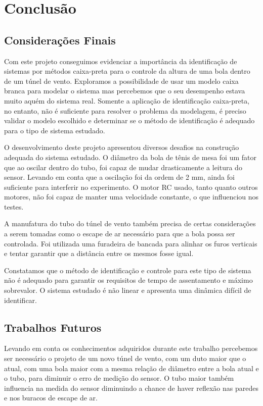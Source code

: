 \chapter{Conclusão} \label{cap7}

\section{Considerações Finais}
Com este projeto conseguimos evidenciar a importância da identificação de sistemas por métodos caixa-preta para o controle da altura de uma bola dentro de um túnel de vento. Exploramos a possibilidade de usar um modelo caixa branca para modelar o sistema mas percebemos que o seu desempenho estava muito aquém do sistema real. Somente a aplicação de identificação caixa-preta, no entanto, não é suficiente para resolver o problema da modelagem, é preciso validar o modelo escolhido e determinar se o método de identificação é adequado para o tipo de sistema estudado.


O desenvolvimento deste projeto apresentou diversos desafios na construção adequada do sistema estudado. O diâmetro da bola de tênis de mesa foi um fator que ao oscilar dentro do tubo, foi capaz de mudar drasticamente a leitura do sensor. Levando em conta que a oscilação foi da ordem de 2 mm, ainda foi suficiente para interferir no experimento. O motor RC usado, tanto quanto outros motores, não foi capaz de manter uma velocidade constante, o que influenciou nos testes.


A manufatura do tubo do túnel de vento também precisa de certas considerações a serem tomadas como o escape de ar necessário para que a bola possa ser controlada. Foi utilizada uma furadeira de bancada para alinhar os furos verticais e tentar garantir que a distância entre os mesmos fosse igual.


Constatamos que o método de identificação e controle para este tipo de sistema não é adequado para garantir os requisitos de tempo de assentamento e máximo sobrevalor. O sistema estudado é não linear e apresenta uma dinâmica difícil de identificar.




\section{Trabalhos Futuros}
Levando em conta os conhecimentos adquiridos durante este trabalho percebemos ser necessário o projeto de um novo túnel de vento, com um duto maior que o atual, com uma bola maior com a mesma relação de diâmetro entre a bola atual e o tubo, para diminuir o erro de medição do sensor. O tubo maior também influencia na medida do sensor diminuindo a chance de haver reflexão nas paredes e nos buracos de escape de ar. 




